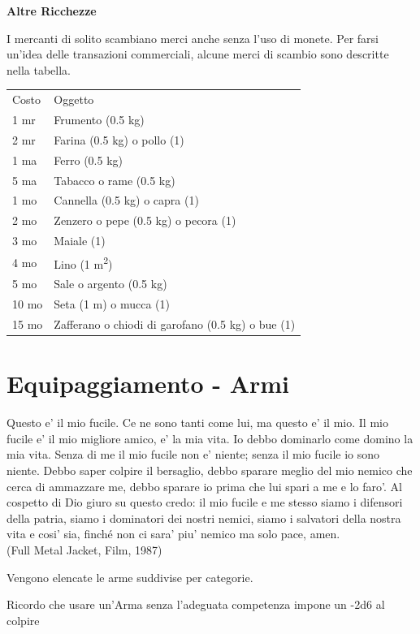 \documentclass[a4paper,11pt,twoside,openany]{dndbook}
\begin{document}
{\textbf{Altre Ricchezze}

I mercanti di solito scambiano merci anche senza l'uso di monete.
Per farsi un'idea delle transazioni commerciali, alcune merci di scambio
sono descritte nella tabella.

\begin{tabular}[c]{@{}ll@{}}
\toprule 
Costo & Oggetto\tabularnewline
1 mr & Frumento (0.5 kg)\tabularnewline
2 mr & Farina (0.5 kg) o pollo (1)\tabularnewline
1 ma & Ferro (0.5 kg)\tabularnewline
5 ma & Tabacco o rame (0.5 kg)\tabularnewline
1 mo & Cannella (0.5 kg) o capra (1)\tabularnewline
2 mo & Zenzero o pepe (0.5 kg) o pecora (1)\tabularnewline
3 mo & Maiale (1)\tabularnewline
4 mo & Lino (1 m\textsuperscript{2})\tabularnewline
5 mo & Sale o argento (0.5 kg)\tabularnewline
10 mo & Seta (1 m) o mucca (1)\tabularnewline
15 mo & Zafferano o chiodi di garofano (0.5 kg) o bue (1)\tabularnewline
\bottomrule
\end{tabular}

\pagebreak

\section{Equipaggiamento - Armi}

\label{equipaggiamento---armi}
\begin{quotebox}
Questo e' il mio fucile. Ce ne sono tanti come lui, ma questo e' il mio. Il mio fucile e' il mio migliore amico, e' la mia vita. Io debbo dominarlo come domino la mia vita. Senza di me il mio fucile non e' niente; senza il mio fucile io sono niente. Debbo saper colpire il bersaglio, debbo sparare meglio del mio nemico che cerca di ammazzare me, debbo sparare io prima che lui spari a me e lo faro'. Al cospetto di Dio giuro su questo credo: il mio fucile e me stesso siamo i difensori della patria, siamo i dominatori dei nostri nemici, siamo i salvatori della nostra vita e cosi' sia, finché non ci sara' piu' nemico ma solo pace, amen.
\\
(Full Metal Jacket, Film, 1987)
\end{quotebox}

Vengono elencate le arme suddivise per categorie.

Ricordo che usare un'Arma senza l'adeguata competenza impone un -2d6 al colpire

}
\end{document}

